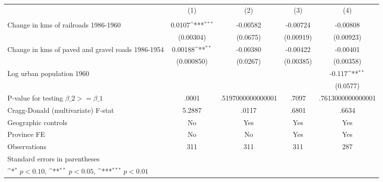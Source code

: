{
\def\sym#1{\ifmmode^{#1}\else\(^{#1}\)\fi}
\begin{tabular}{l*{4}{c}}
\hline\hline
                &\multicolumn{1}{c}{(1)}&\multicolumn{1}{c}{(2)}&\multicolumn{1}{c}{(3)}&\multicolumn{1}{c}{(4)}\\
                &\multicolumn{1}{c}{}&\multicolumn{1}{c}{}&\multicolumn{1}{c}{}&\multicolumn{1}{c}{}\\
\hline
Change in kms of railroads 1986-1960&   0.0107\sym{***}& -0.00582         & -0.00724         & -0.00808         \\
                &(0.00304)         & (0.0675)         &(0.00919)         &(0.00923)         \\
[1em]
Change in kms of paved and gravel roads 1986-1954&  0.00188\sym{**} & -0.00380         & -0.00422         & -0.00401         \\
                &(0.000850)         & (0.0267)         &(0.00385)         &(0.00358)         \\
[1em]
Log urban population 1960&                  &                  &                  &   -0.117\sym{**} \\
                &                  &                  &                  & (0.0577)         \\
\hline
P-value for testing $\beta\_{2} >= \beta\_{1}$&    .0001         &.5197000000000001         &    .7097         &.7613000000000001         \\
Cragg-Donald (multivariate) F-stat&   5.2887         &    .0117         &    .6801         &    .6634         \\
Geographic controls&       No         &      Yes         &      Yes         &      Yes         \\
Province FE     &       No         &       No         &      Yes         &      Yes         \\
Observations    &      311         &      311         &      311         &      287         \\
\hline\hline
\multicolumn{5}{l}{\footnotesize Standard errors in parentheses}\\
\multicolumn{5}{l}{\footnotesize \sym{*} \(p<0.10\), \sym{**} \(p<0.05\), \sym{***} \(p<0.01\)}\\
\end{tabular}
}
